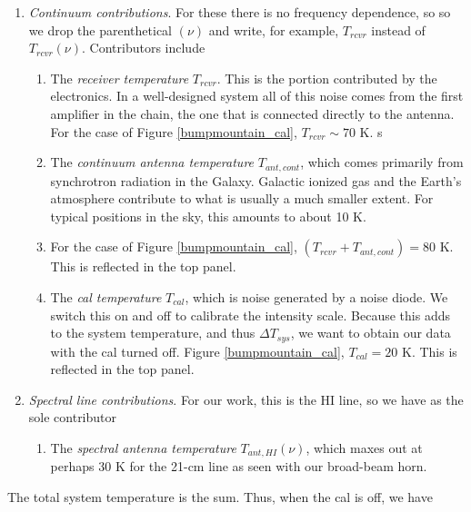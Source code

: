 \begin{enumerate}

	\item {\it Continuum contributions}. For these there is no
frequency dependence, so so we drop the parenthetical $(\nu )$ and
write, for example, $T_{rcvr}$ instead of $T_{rcvr}(\nu)$. Contributors
include \begin{enumerate}

	\item The {\it receiver temperature} $T_{rcvr}$. This is the
portion contributed by the electronics. In a well-designed system all of
this noise comes from the first amplifier in the chain, the one that is
connected directly to the antenna. For the case of Figure
\ref{bumpmountain_cal}, $T_{rcvr} \sim 70$ K.
s
	\item The {\it continuum antenna temperature} $T_{ant, cont}$,
which comes primarily from synchrotron radiation in the Galaxy. Galactic
ionized gas and the Earth's atmosphere contribute to what is usually a much
smaller extent. For typical positions in the sky, this amounts to about
10 K. 

\item For the case of Figure \ref{bumpmountain_cal}, $(T_{rcvr} + T_{ant,
  cont}) = 80$ K. This is reflected in the top panel. 

	\item The {\it cal temperature} $T_{cal}$, which is noise
generated by a noise diode. We switch this on and off to calibrate the
intensity scale. Because this adds to the system temperature, and thus
$\Delta T_{sys}$, we want to obtain our data with the cal turned off.
Figure \ref{bumpmountain_cal}, $T_{cal} = 20$ K. This is reflected in
the top panel.

\end{enumerate}

\item {\it Spectral line contributions}. For our work, this is the HI
line, so we have as the sole contributor \begin{enumerate}

	\item The {\it spectral antenna temperature} $T_{ant, HI}(\nu)$,
which maxes out at perhaps 30 K for the 21-cm line as seen with our
broad-beam horn.

\end{enumerate}
\end{enumerate}

	The total system temperature is the sum. Thus, when the cal is
off, we have

